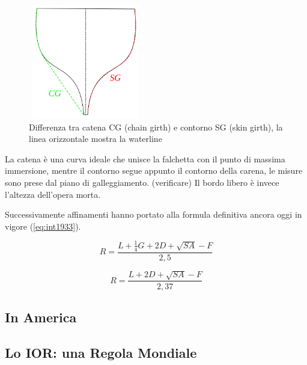 			\begin{figure}
				\centering
				\includegraphics[width=5cm, height=5cm]{img/catena}
				\caption{Differenza tra catena CG (chain girth) e contorno SG (skin girth), la linea orizzontale mostra la waterline}
				\label{fig:catena&contorno}
			\end{figure}
			
			La catena è una curva ideale che unisce la falchetta con il punto di massima immersione, mentre il contorno segue appunto il contorno della carena, le misure sono prese dal piano di galleggiamento. (verificare)
			Il bordo libero è invece l'altezza dell'opera morta.
			
			Successivamente affinamenti hanno portato alla formula definitiva ancora oggi in vigore (\ref{eq:int1933}).
			
				\begin{center}
					\begin{equation}
					R=\frac{L+\frac{1}{4}G+2D+\sqrt{SA}-F }{2,5}
					\label{eq:int1919}
					\end{equation}
				\end{center}
				
				\begin{center}
					\begin{equation}
					R=\frac{L+2D+\sqrt{SA}-F }{2,37}
					\label{eq:int1933}
					\end{equation}
				\end{center}
					
			\subsection{In America}
			
			\subsection{Lo IOR: una Regola Mondiale}
					
